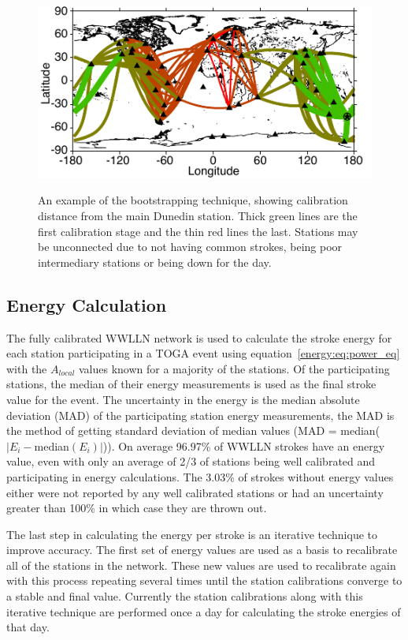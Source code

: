 \begin{figure}[ht!]
\centering
\includegraphics[scale=1]{energy/Figures/PPS_Hop.pdf}\\
\caption{An example of the bootstrapping technique, showing calibration distance from the main Dunedin station. Thick green lines are the first calibration stage and the thin red lines the last. Stations may be unconnected due to not having common strokes, being poor intermediary stations or being down for the day.}
\label{energy:fig:bootstrap}
\end{figure}

\subsection{Energy Calculation}

The fully calibrated WWLLN network is used to calculate the stroke energy for each station participating in a TOGA event using equation~\ref{energy:eq:power_eq} with the $A_{local}$ values known for a majority of the stations.
Of the participating stations, the median of their energy measurements is used as the final stroke value for the event.
The uncertainty in the energy is the median absolute deviation (MAD) of the participating station energy measurements, the MAD is the method of getting standard deviation of median values (MAD = median($|E_i - $median$(E_i)|$)).
On average 96.97\% of WWLLN strokes have an energy value, even with only an average of 2/3 of stations being well calibrated and participating in energy calculations.
The 3.03\% of strokes without energy values either were not reported by any well calibrated stations or had an uncertainty greater than 100\% in which case they are thrown out.

The last step in calculating the energy per stroke is an iterative technique to improve accuracy.
The first set of energy values are used as a basis to recalibrate all of the stations in the network.
These new values are used to recalibrate again with this process repeating several times until the station calibrations converge to a stable and final value.
Currently the station calibrations along with this iterative technique are performed once a day for calculating the stroke energies of that day.

